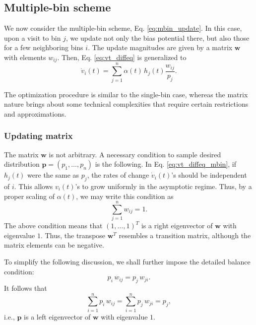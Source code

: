 \documentclass[reprint]{revtex4-1}
\begin{document}
\subsection{\label{sec:multiple-bin}
Multiple-bin scheme}



We now consider the multiple-bin scheme,
Eq. \eqref{eq:mbin_update}.
%
In this case,
upon a visit to bin $j$,
we update not only the bias potential there,
but also those for a few neighboring bins $i$.
%
The update magnitudes are given by a matrix $\mathbf w$
with elements $w_{ij}$.
%
Then, Eq. \eqref{eq:vt_diffeq} is generalized to
\begin{equation}
  \dot v_i(t) =
  \sum_{j=1}^n \alpha(t) \, h_j(t) \frac{ w_{ij} } { p_j }.
  \label{eq:vt_diffeq_mbin}
\end{equation}


The optimization procedure is similar to the single-bin case,
whereas the matrix nature brings about
some technical complexities that require
certain restrictions and approximations.



\subsubsection{\label{sec:updating-matrix}
Updating matrix}



The matrix $\mathbf w$ is not arbitrary.
%
A necessary condition to sample desired distribution
$\mathbf p = (p_1, \dots, p_n)$
is the following.
%
In Eq. \eqref{eq:vt_diffeq_mbin},
if $h_j(t)$ were the same as $p_j$,
the rates of change $\dot v_i(t)$'s
should be independent of $i$.
%
This allows $v_i(t)$'s to grow uniformly
in the asymptotic regime.
%
Thus, by a proper scaling of $\alpha(t)$,
we may write this condition as
%
\begin{equation}
  \sum_{j = 1}^n w_{ij} = 1.
  \label{eq:w_sumj}
\end{equation}
%
The above condition means that $(1, \dots, 1)^T$
is a right eigenvector of $\mathbf w$
with eigenvalue $1$.
%
Thus, the transpose $\mathbf w^T$
resembles a transition matrix,
although the matrix elements can be negative.



To simplify the following discussion,
we shall further impose the
detailed balance condition:
%
\begin{equation}
  p_i \, w_{ij} = p_j \, w_{ji}.
  \label{eq:w_detailedbalance}
\end{equation}
%
It follows that
\begin{equation}
  \sum_{i = 1}^n p_i \, w_{ij}
  =
  \sum_{i = 1}^n p_j \, w_{ji}
  = p_j,
  \label{eq:w_balance}
\end{equation}
%
i.e., $\mathbf p$ is a left eigenvector of
$\mathbf w$ with eigenvalue $1$.
\end{document}
